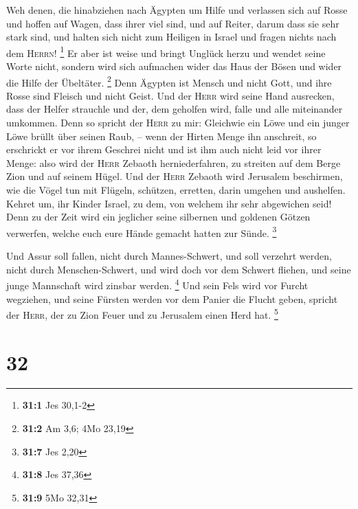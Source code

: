  Weh denen, die hinabziehen nach Ägypten um Hilfe und
verlassen sich auf Rosse und hoffen auf Wagen, dass ihrer viel sind, und
auf Reiter, darum dass sie sehr stark sind, und halten sich nicht zum
Heiligen in Israel und fragen nichts nach dem \textsc{Herrn}!
\footnote{\textbf{31:1} Jes 30,1-2}  Er aber ist weise und
bringt Unglück herzu und wendet seine Worte nicht, sondern wird sich
aufmachen wider das Haus der Bösen und wider die Hilfe der Übeltäter.
\footnote{\textbf{31:2} Am 3,6; 4Mo 23,19}  Denn Ägypten
ist Mensch und nicht Gott, und ihre Rosse sind Fleisch und nicht Geist.
Und der \textsc{Herr} wird seine Hand ausrecken, dass der Helfer
strauchle und der, dem geholfen wird, falle und alle miteinander
umkommen.  Denn so spricht der \textsc{Herr} zu mir:
Gleichwie ein Löwe und ein junger Löwe brüllt über seinen Raub, -- wenn
der Hirten Menge ihn anschreit, so erschrickt er vor ihrem Geschrei
nicht und ist ihm auch nicht leid vor ihrer Menge: also wird der
\textsc{Herr} Zebaoth herniederfahren, zu streiten auf dem Berge Zion
und auf seinem Hügel.  Und der \textsc{Herr} Zebaoth wird
Jerusalem beschirmen, wie die Vögel tun mit Flügeln, schützen, erretten,
darin umgehen und aushelfen.  Kehret um, ihr Kinder
Israel, zu dem, von welchem ihr sehr abgewichen seid! 
Denn zu der Zeit wird ein jeglicher seine silbernen und goldenen Götzen
verwerfen, welche euch eure Hände gemacht hatten zur Sünde. \footnote{\textbf{31:7}
  Jes 2,20}

 Und Assur soll fallen, nicht durch Mannes-Schwert, und
soll verzehrt werden, nicht durch Menschen-Schwert, und wird doch vor
dem Schwert fliehen, und seine junge Mannschaft wird zinsbar werden.
\footnote{\textbf{31:8} Jes 37,36}  Und sein Fels wird vor
Furcht wegziehen, und seine Fürsten werden vor dem Panier die Flucht
geben, spricht der \textsc{Herr}, der zu Zion Feuer und zu Jerusalem
einen Herd hat. \footnote{\textbf{31:9} 5Mo 32,31}

\hypertarget{section-13}{%
\section{32}\label{section-13}}

